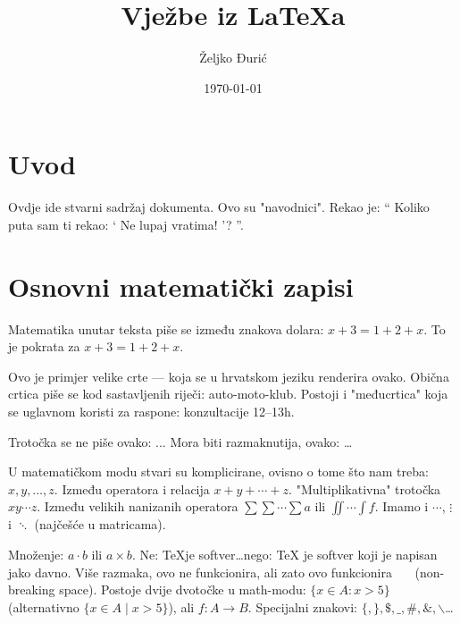 \documentclass[12pt]{scrartcl}
\begin{document}
    \title{Vježbe iz \LaTeX a}
    \author{Željko Đurić}
    \date{\today}
    \maketitle
    \section{Uvod}
        Ovdje ide stvarni sadržaj dokumenta.
        Ovo su "navodnici".
        Rekao je:
        \enquote {
            Koliko puta sam ti rekao:
                \enquote {
                    Ne lupaj vratima!
                }?
        }.
    \section{Osnovni matematički zapisi}
        Matematika unutar teksta piše se između znakova dolara: $x + 3 = 1 + 2 + x$.
        To je pokrata za \(x + 3 = 1 + 2 + x\). %

        Ovo je primjer velike crte --- koja se u hrvatskom jeziku renderira ovako.
        Obična crtica piše se kod sastavljenih riječi: auto-moto-klub.
        Postoji i "međucrtica" koja se uglavnom koristi za raspone: konzultacije 12--13h.

        Trotočka se ne piše ovako: ... Mora biti razmaknutija, ovako: \ldots

        U matematičkom modu stvari su komplicirane, ovisno o tome što nam treba: $x,y,\dotsc,z$.
        Između operatora i relacija $x+y+\dotsb+z$.
        "Multiplikativna" trotočka $xy\dotsm z$.
        Između velikih nanizanih operatora $\sum\sum\dotsi\sum a$ ili $\iint\dotsi\int f$.
        Imamo i $\cdots$, $\vdots$ i $\ddots$ (najčešće u matricama).

        Množenje: $a\cdot b$ ili $a \times b$.
        Ne: \TeX je softver\ldots nego: \TeX{} je softver koji je napisan jako davno.
        Više razmaka,    ovo ne funkcionira, ali zato ovo funkcionira \ \ \ (non-breaking space).
        Postoje dvije dvotočke u math-modu: $\{x \in A : x > 5 \}$
        (alternativno $\{x \in A \mid x > 5 \}$), ali $f \colon A \to B$. Specijalni znakovi: $ \{, \}, \$, \_, \#, \&, \backslash $\ldots
\end{document}
